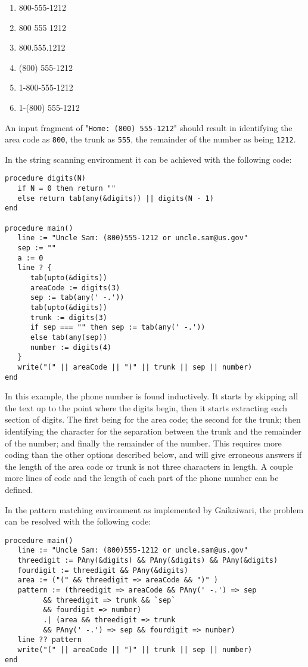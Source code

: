 \documentclass{article}
\begin{document}
\begin{singlespace}
\begin{enumerate}
\item 800-555-1212
\item 800 555 1212
\item 800.555.1212
\item (800) 555-1212
\item 1-800-555-1212
\item 1-(800) 555-1212
\end{enumerate}
\end{singlespace}

An input fragment of "\texttt{Home: (800) 555-1212}" should result in identifying the area code as \texttt{800}, the trunk as \texttt{555}, the remainder of the number as being \texttt{1212}.

In the string scanning environment it can be achieved with the following code:
\begin{verbatim}
procedure digits(N)
   if N = 0 then return ""
   else return tab(any(&digits)) || digits(N - 1)
end

procedure main()
   line := "Uncle Sam: (800)555-1212 or uncle.sam@us.gov"
   sep := ""
   a := 0
   line ? {
      tab(upto(&digits))
      areaCode := digits(3)
      sep := tab(any(' -.'))
      tab(upto(&digits))
      trunk := digits(3)
      if sep === "" then sep := tab(any(' -.'))
      else tab(any(sep))
      number := digits(4)
   }
   write("(" || areaCode || ")" || trunk || sep || number)
end
\end{verbatim}
In this example, the phone number is found inductively.  It starts by skipping all the text up to the point where the digits begin, then it starts extracting each section of digits.  The first being for the area code; the second for the trunk; then identifying the character for the separation between the trunk and the remainder of the number; and finally the remainder of the number.  This requires more coding than the other options described below, and will give erroneous answers if the length of the area code or trunk is not three characters in length.  A couple more lines of code and the length of each part of the phone number can be defined.

In the pattern matching environment as implemented by Gaikaiwari, the problem can be resolved with the following code:
\begin{verbatim}
procedure main()
   line := "Uncle Sam: (800)555-1212 or uncle.sam@us.gov"
   threedigit := PAny(&digits) && PAny(&digits) && PAny(&digits)
   fourdigit := threedigit && PAny(&digits)
   area := ("(" && threedigit => areaCode && ")" )
   pattern := (threedigit => areaCode && PAny(' -.') => sep
         && threedigit => trunk && `sep`
         && fourdigit => number)
         .| (area && threedigit => trunk
         && PAny(' -.') => sep && fourdigit => number)
   line ?? pattern
   write("(" || areaCode || ")" || trunk || sep || number) 
end
\end{verbatim}
\end{document}
